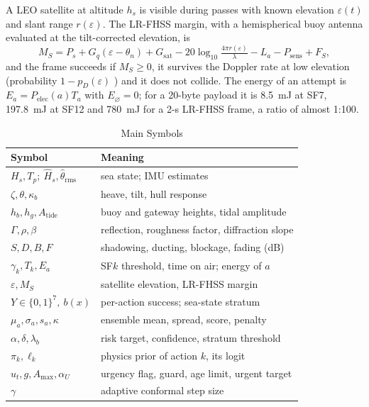 \documentclass[journal]{IEEEtran}\def\WARDENieee{1}%
\newcommand{\Hs}{H_s}
\newcommand{\Hhat}{\hat H_s}
\newcommand{\defer}{\varnothing}
\begin{document}
A LEO satellite at altitude $h_s$ is visible during passes with known elevation $\varepsilon(t)$ and slant range $r(\varepsilon)$. The LR-FHSS margin, with a hemispherical buoy antenna evaluated at the tilt-corrected elevation, is
\begin{equation}
M_S=P_s+G_q(\varepsilon-\theta_n)+G_{\mathrm{sat}}-20\log_{10}\tfrac{4\pi r(\varepsilon)}{\lambda}-L_a-P_{\mathrm{sens}}+F_S ,\label{eq:sat}
\end{equation}
and the frame succeeds if $M_S\ge0$, it survives the Doppler rate at low elevation (probability $1-p_D(\varepsilon)$ \cite{b17}) and it does not collide. The energy of an attempt is $E_a=P_{\mathrm{elec}}(a)T_a$ with $E_\defer=0$; for a 20-byte payload it is 8.5~mJ at SF7, 197.8~mJ at SF12 and 780~mJ for a 2-s LR-FHSS frame, a ratio of almost 1:100.

\begin{table}[!t]
\caption{Main Symbols}\label{tab:sym}
\centering\scriptsize\setlength{\tabcolsep}{3pt}
\begin{tabular}{@{}ll@{}}
\toprule
Symbol & Meaning\\\midrule
$\Hs,T_p;\ \Hhat,\hat\theta_{\mathrm{rms}}$ & sea state; IMU estimates\\
$\zeta,\theta,\kappa_b$ & heave, tilt, hull response\\
$h_b,h_g,A_{\mathrm{tide}}$ & buoy and gateway heights, tidal amplitude\\
$\Gamma,\rho,\beta$ & reflection, roughness factor, diffraction slope\\
$S,D,B,F$ & shadowing, ducting, blockage, fading (dB)\\
$\gamma_k,T_k,E_a$ & SF$k$ threshold, time on air; energy of $a$\\
$\varepsilon,M_S$ & satellite elevation, LR-FHSS margin\\
$Y\in\{0,1\}^7,\ b(x)$ & per-action success; sea-state stratum\\
$\mu_a,\sigma_a,s_a,\kappa$ & ensemble mean, spread, score, penalty\\
$\alpha,\delta,\lambda_b$ & risk target, confidence, stratum threshold\\
$\pi_k,\ell_k$ & physics prior of action $k$, its logit\\
$u_t,g,A_{\max},\alpha_U$ & urgency flag, guard, age limit, urgent target\\
$\gamma$ & adaptive conformal step size\\
\bottomrule
\end{tabular}
\end{table}
\end{document}
